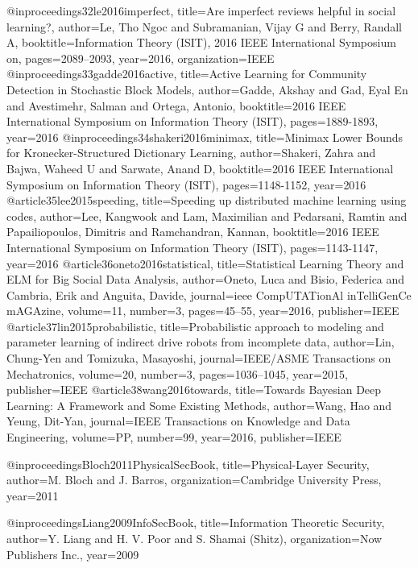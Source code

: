 {{{{{{@inproceedings{32le2016imperfect,
	title={Are imperfect reviews helpful in social learning?},
	author={Le, Tho Ngoc and Subramanian, Vijay G and Berry, Randall A},
	booktitle={Information Theory (ISIT), 2016 IEEE International Symposium on},
	pages={2089--2093},
	year={2016},
	organization={IEEE}
}
@inproceedings{33gadde2016active,
	title={Active Learning for Community Detection in Stochastic Block Models},
	author={Gadde, Akshay and Gad, Eyal En and Avestimehr, Salman and Ortega, Antonio},
	booktitle={2016 IEEE International Symposium on Information Theory (ISIT)},
	pages={1889-1893},
	year={2016}
}
@inproceedings{34shakeri2016minimax,
	title={Minimax Lower Bounds for Kronecker-Structured Dictionary Learning},
	author={Shakeri, Zahra and Bajwa, Waheed U and Sarwate, Anand D},
	booktitle={2016 IEEE International Symposium on Information Theory (ISIT)},
	pages={1148-1152},
	year={2016}
}
@article{35lee2015speeding,
	title={Speeding up distributed machine learning using codes},
	author={Lee, Kangwook and Lam, Maximilian and Pedarsani, Ramtin and Papailiopoulos, Dimitris and Ramchandran, Kannan},
	booktitle={2016 IEEE International Symposium on Information Theory (ISIT)},
	pages={1143-1147},
	year={2016}
}
@article{36oneto2016statistical,
	title={Statistical Learning Theory and ELM for Big Social Data Analysis},
	author={Oneto, Luca and Bisio, Federica and Cambria, Erik and Anguita, Davide},
	journal={ieee CompUTATionAl inTelliGenCe mAGAzine},
	volume={11},
	number={3},
	pages={45--55},
	year={2016},
	publisher={IEEE}
}
@article{37lin2015probabilistic,
	title={Probabilistic approach to modeling and parameter learning of indirect drive robots from incomplete data},
	author={Lin, Chung-Yen and Tomizuka, Masayoshi},
	journal={IEEE/ASME Transactions on Mechatronics},
	volume={20},
	number={3},
	pages={1036--1045},
	year={2015},
	publisher={IEEE}
}
@article{38wang2016towards,
	title={Towards Bayesian Deep Learning: A Framework and Some Existing Methods},
	author={Wang, Hao and Yeung, Dit-Yan},
	journal={IEEE Transactions on Knowledge and Data Engineering},
	volume={PP},
	number={99},
	year={2016},
	publisher={IEEE}
}






@inproceedings{Bloch2011PhysicalSecBook,
	title={Physical-Layer Security},
	author={M. Bloch and J. Barros},
	organization={Cambridge University Press},
	year={2011}
}



@inproceedings{Liang2009InfoSecBook,
	title={Information Theoretic Security},
	author={Y. Liang and H. V. Poor and S. Shamai (Shitz)},
	organization={Now Publishers Inc.},
	year={2009}
}


}}}}}}
